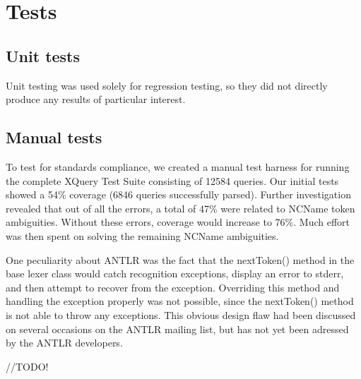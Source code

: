 \section{Tests}
\subsection{Unit tests}
Unit testing was used solely for regression testing, so they did not directly 
produce any results of particular interest.

\subsection{Manual tests}
To test for standards compliance, we created a manual test harness for running
the complete XQuery Test Suite\cite{w3c05} consisting of 12584 queries. Our
initial tests showed a 54\% coverage (6846 queries successfully parsed). Further
investigation revealed that out of all the errors, a total of 47\% were related
to NCName token ambiguities. Without these errors, coverage would increase to
76\%. Much effort was then spent on solving the remaining NCName ambiguities.

One peculiarity about ANTLR was the fact that the nextToken() method in the base
lexer class would catch recognition exceptions, display an error to stderr, and
then attempt to recover from the exception. Overriding this method and handling
the exception properly was not possible, since the nextToken() method is not
able to throw any exceptions. This obvious design flaw had been discussed on
several occasions on the ANTLR mailing list\cite{antlrmail}, but has not yet
been adressed by the ANTLR developers.

//TODO!


